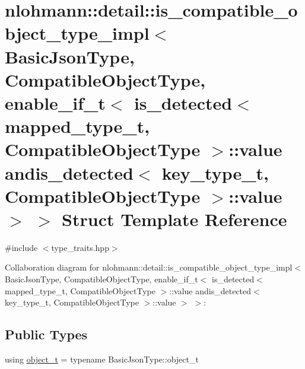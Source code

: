 \hypertarget{structnlohmann_1_1detail_1_1is__compatible__object__type__impl_3_01_basic_json_type_00_01_compat75620afbe5f5959fc5f30d50406483f9}{}\section{nlohmann\+:\+:detail\+:\+:is\+\_\+compatible\+\_\+object\+\_\+type\+\_\+impl$<$ Basic\+Json\+Type, Compatible\+Object\+Type, enable\+\_\+if\+\_\+t$<$ is\+\_\+detected$<$ mapped\+\_\+type\+\_\+t, Compatible\+Object\+Type $>$\+:\+:value andis\+\_\+detected$<$ key\+\_\+type\+\_\+t, Compatible\+Object\+Type $>$\+:\+:value $>$ $>$ Struct Template Reference}
\label{structnlohmann_1_1detail_1_1is__compatible__object__type__impl_3_01_basic_json_type_00_01_compat75620afbe5f5959fc5f30d50406483f9}


{\ttfamily \#include $<$type\+\_\+traits.\+hpp$>$}



Collaboration diagram for nlohmann\+:\+:detail\+:\+:is\+\_\+compatible\+\_\+object\+\_\+type\+\_\+impl$<$ Basic\+Json\+Type, Compatible\+Object\+Type, enable\+\_\+if\+\_\+t$<$ is\+\_\+detected$<$ mapped\+\_\+type\+\_\+t, Compatible\+Object\+Type $>$\+:\+:value andis\+\_\+detected$<$ key\+\_\+type\+\_\+t, Compatible\+Object\+Type $>$\+:\+:value $>$ $>$\+:
\subsection*{Public Types}
\begin{DoxyCompactItemize}
\item 
using \hyperlink{structnlohmann_1_1detail_1_1is__compatible__object__type__impl_3_01_basic_json_type_00_01_compat75620afbe5f5959fc5f30d50406483f9_acd305072ea2f10c3d1226af62d2d61d7}{object\+\_\+t} = typename Basic\+Json\+Type\+::object\+\_\+t
\end{DoxyCompactItemize}
